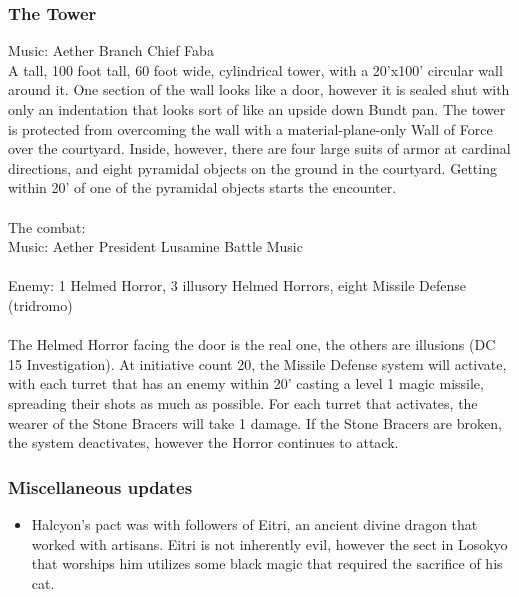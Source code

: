 \subsubsection{The Tower}
Music: Aether Branch Chief Faba\\
A tall, 100 foot tall, 60 foot wide, cylindrical tower, with a 20'x100' circular wall around it. One section of the wall looks like a door, however it is sealed shut with only an indentation that looks sort of like an upside down Bundt pan. The tower is protected from overcoming the wall with a material-plane-only Wall of Force over the courtyard. Inside, however, there are four large suits of armor at cardinal directions, and eight pyramidal objects on the ground in the courtyard. Getting within 20' of one of the pyramidal objects starts the encounter.\\
\\
The combat:\\
Music: Aether President Lusamine Battle Music \\
\\
Enemy: 1 Helmed Horror, 3 illusory Helmed Horrors, eight Missile Defense (tridromo)\\
\\
The Helmed Horror facing the door is the real one, the others are illusions (DC 15 Investigation). At initiative count 20, the Missile Defense system will activate, with each turret that has an enemy within 20' casting a level 1 magic missile, spreading their shots as much as possible. For each turret that activates, the wearer of the Stone Bracers will take 1 damage. If the Stone Bracers are broken, the system deactivates, however the Horror continues to attack.\\ 

\subsubsection{Miscellaneous updates}
\begin{itemize}
\item Halcyon's pact was with followers of Eitri, an ancient divine dragon that worked with artisans. Eitri is not inherently evil, however the sect in Losokyo that worships him utilizes some black magic that required the sacrifice of his cat.
\end{itemize}